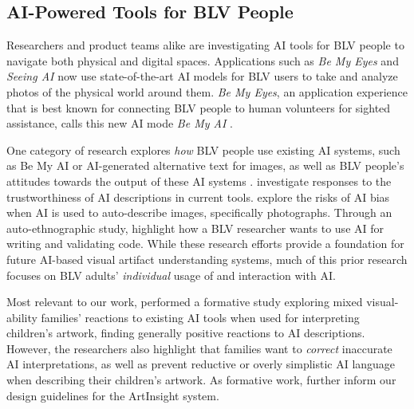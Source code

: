 \subsection{AI-Powered Tools for BLV People}
Researchers and product teams alike are investigating AI tools for BLV people to navigate both physical and digital spaces. Applications such as \textit{Be My Eyes} \cite{be_my_eyes_2024} and \textit{Seeing AI} now use state-of-the-art AI models for BLV users to take and analyze photos of the physical world around them. \textit{Be My Eyes}, an application experience that is best known for connecting BLV people to human volunteers for sighted assistance, calls this new AI mode \textit{Be My AI} \cite{be_my_ai_2024}.  

One category of research explores \textit{how} BLV people use existing AI systems, such as Be My AI or AI-generated alternative text for images, as well as BLV people's attitudes towards the output of these AI systems \cite{gonzalez_CHI, Das_ProvenanceToAberrations, bennett_itscomplicated, Glazko_Autoethnography}. \citet{gonzalez_CHI} investigate responses to the trustworthiness of AI descriptions in current tools. \citet{bennett_itscomplicated} explore the risks of AI bias when AI is used to auto-describe images, specifically photographs. Through an auto-ethnographic study, \citet{Glazko_Autoethnography} highlight how a BLV researcher wants to use AI for writing and validating code. While these research efforts provide a foundation for future AI-based visual artifact understanding systems, much of this prior research focuses on BLV adults' \textit{individual} usage of and interaction with AI.

Most relevant to our work, \citet{chhedakothary2024} performed a formative study exploring mixed visual-ability families' reactions to existing AI tools when used for interpreting children's artwork, finding generally positive reactions to AI descriptions. However, the researchers also highlight that families want to \textit{correct} inaccurate AI interpretations, as well as prevent reductive or overly simplistic AI language when describing their children's artwork. As formative work, \citet{chhedakothary2024} further inform our design guidelines for the ArtInsight system. 

